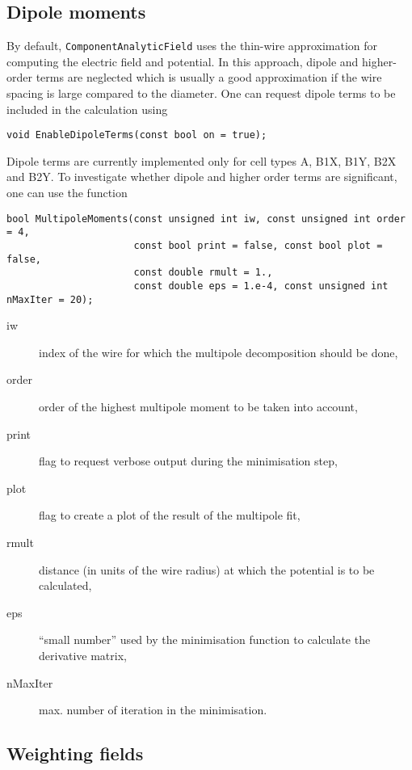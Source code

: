 \subsection{Dipole moments}
By default, \texttt{ComponentAnalyticField} uses the thin-wire approximation
for computing the electric field and potential. In this approach, 
dipole and higher-order terms are neglected which is usually a good   
approximation if the wire spacing is large compared to the diameter.
One can request dipole terms to be included in the calculation using
\begin{lstlisting}
void EnableDipoleTerms(const bool on = true);
\end{lstlisting}
Dipole terms are currently implemented only for cell types 
A, B1X, B1Y, B2X and B2Y.
To investigate whether dipole and higher order terms are significant, 
one can use the function
\begin{lstlisting}
bool MultipoleMoments(const unsigned int iw, const unsigned int order = 4,
                      const bool print = false, const bool plot = false, 
                      const double rmult = 1.,
                      const double eps = 1.e-4, const unsigned int nMaxIter = 20);
\end{lstlisting} 
\begin{description}
  \item[iw] index of the wire for which the multipole decomposition should be done,
  \item[order] order of the highest multipole moment to be taken into account,
  \item[print] flag to request verbose output during the minimisation step,
  \item[plot] flag to create a plot of the result of the multipole fit,
  \item[rmult] distance (in units of the wire radius) at which the potential 
               is to be calculated,
  \item[eps] ``small number'' used by the minimisation function to calculate the derivative matrix,
  \item[nMaxIter] max. number of iteration in the minimisation.
\end{description}

\subsection{Weighting fields}

